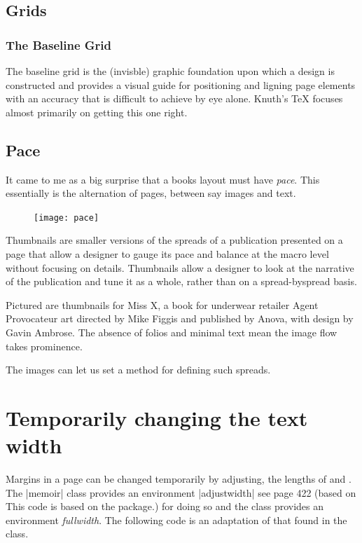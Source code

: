 \section{Grids}

\subsection{The Baseline Grid}

The baseline grid is the (invisble) graphic foundation upon which a design is constructed and provides a visual guide for positioning and ligning page elements with an accuracy that is difficult to achieve by eye alone. Knuth's TeX focuses almost primarily on getting this one right.

\section{Pace}

It came to me as a big surprise that a books layout must have \textit{pace}. This essentially is the alternation of pages, between say images and text.

\begin{figure}[htbp]
\parindent=0pt
\texttt{[image: pace]}

\end{figure}

Thumbnails are smaller versions of the spreads of a publication presented on a
page that allow a designer to gauge its pace and balance at the macro level
without focusing on details. Thumbnails allow a designer to look at the
narrative of the publication and tune it as a whole, rather than on a spread-byspread
basis.

Pictured are thumbnails for Miss X, a book for underwear retailer Agent
Provocateur art directed by Mike Figgis and published by Anova, with design by
Gavin Ambrose. The absence of folios and minimal text mean the image flow
takes prominence.

The images can let us set a method for defining such spreads. 


\chapter{Temporarily changing the text width}



Margins in a page can be changed temporarily by adjusting, the lengths of \cmd{\leftskip} and \cmd{\rightskip}. The |memoir| class provides an environment |adjustwidth| see page 422 (based on This code is based on the  package.) for doing so and the  class provides an environment \textit{fullwidth}. The following code is an adaptation of that found in the  class.



